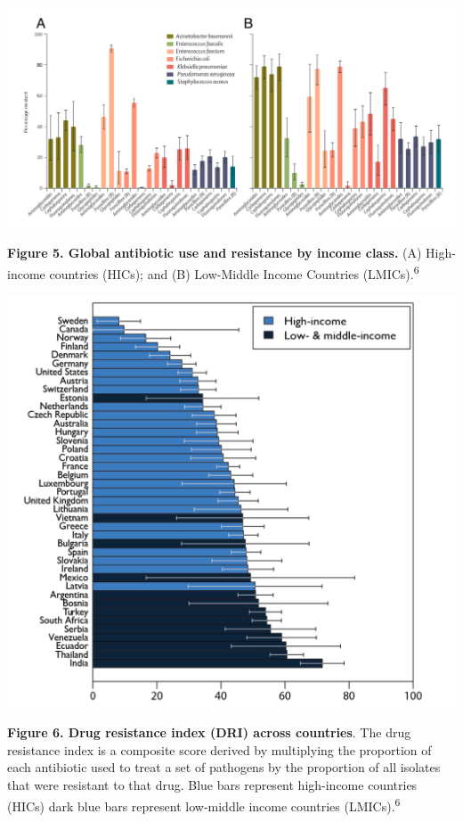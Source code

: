 \documentclass[
  11pt,
  paper=a4,
  ,captions=tableheading
]{scrartcl}
\begin{document}
\includegraphics[width=6.25in,height=\textheight]{images/worldwideresistance.png}

\textbf{Figure 5. Global antibiotic use and resistance by income class.}
(A) High-income countries (HICs); and (B) Low-Middle Income Countries
(LMICs).\textsuperscript{6}

\includegraphics[width=6.25in,height=\textheight]{images/DRI.png}

\textbf{Figure 6. Drug resistance index (DRI) across countries}. The
drug resistance index is a composite score derived by multiplying the
proportion of each antibiotic used to treat a set of pathogens by the
proportion of all isolates that were resistant to that drug. Blue bars
represent high-income countries (HICs) dark blue bars represent
low-middle income countries (LMICs).\textsuperscript{6}
\end{document}
